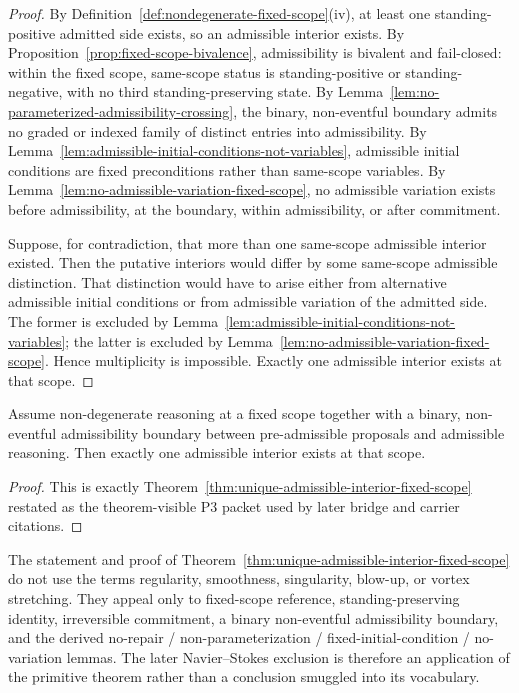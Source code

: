 \begin{proof}
By Definition~\ref{def:nondegenerate-fixed-scope}(iv), at least one standing-positive admitted side exists, so an admissible interior exists. By Proposition~\ref{prop:fixed-scope-bivalence}, admissibility is bivalent and fail-closed: within the fixed scope, same-scope status is standing-positive or standing-negative, with no third standing-preserving state. By Lemma~\ref{lem:no-parameterized-admissibility-crossing}, the binary, non-eventful boundary admits no graded or indexed family of distinct entries into admissibility. By Lemma~\ref{lem:admissible-initial-conditions-not-variables}, admissible initial conditions are fixed preconditions rather than same-scope variables. By Lemma~\ref{lem:no-admissible-variation-fixed-scope}, no admissible variation exists before admissibility, at the boundary, within admissibility, or after commitment.

Suppose, for contradiction, that more than one same-scope admissible interior existed. Then the putative interiors would differ by some same-scope admissible distinction. That distinction would have to arise either from alternative admissible initial conditions or from admissible variation of the admitted side. The former is excluded by Lemma~\ref{lem:admissible-initial-conditions-not-variables}; the latter is excluded by Lemma~\ref{lem:no-admissible-variation-fixed-scope}. Hence multiplicity is impossible. Exactly one admissible interior exists at that scope.
\end{proof}

\begin{manualcorollary}
\label{thm:imported-unique-interior}
Assume non-degenerate reasoning at a fixed scope together with a binary, non-eventful admissibility boundary between pre-admissible proposals and admissible reasoning. Then exactly one admissible interior exists at that scope.
\end{manualcorollary}

\begin{proof}
This is exactly Theorem~\ref{thm:unique-admissible-interior-fixed-scope} restated as the theorem-visible P3 packet used by later bridge and carrier citations.
\end{proof}

\begin{remark}\label{rem:anti-circularity-primitive-layer}
The statement and proof of Theorem~\ref{thm:unique-admissible-interior-fixed-scope} do not use the terms regularity, smoothness, singularity, blow-up, or vortex stretching. They appeal only to fixed-scope reference, standing-preserving identity, irreversible commitment, a binary non-eventful admissibility boundary, and the derived no-repair / non-parameterization / fixed-initial-condition / no-variation lemmas. The later Navier--Stokes exclusion is therefore an application of the primitive theorem rather than a conclusion smuggled into its vocabulary.
\end{remark}


